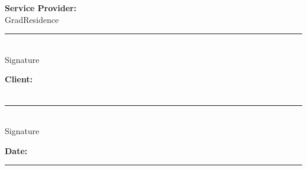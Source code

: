 \documentclass[a4paper,12pt]{article}
\begin{document}
\vspace{1cm}

\noindent \textbf{Service Provider:} \\
GradResidence \\
\noindent \rule{10cm}{0.4pt} \\
Signature

\vspace{1cm}

\noindent \textbf{Client:} \\
 \\
\noindent \rule{10cm}{0.4pt} \\
Signature

\vspace{1cm}

\noindent \textbf{Date:} \\
\noindent \rule{10cm}{0.4pt}
\end{document}

